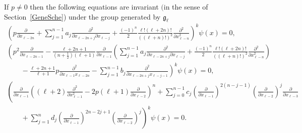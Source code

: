 \documentclass[pdftex]{sigma}
\numberwithin{equation}{section}
\begin{document}
\begin{proposition}
\label{prop6}
If $ p \neq 0 $ then the following equations are invariant $($in the sense of Section~{\rm \ref{GeneSche})} under the group generated
by ${\mathfrak g}_{\ell}$
\begin{gather}
    \left(p \frac{\partial}{\partial x_{\ell-2n}} + \sum\limits_{j=1}^{n-1} a_j \frac{\partial^2}{\partial x_{\ell-2n+j}
\partial x_{\ell-j}} + \frac{(-1)^n}{2} \frac{\ell! (\ell+2n)!}{((\ell+n)!)^2} \frac{\partial^2}{\partial x_{\ell-n}^2}
\right)^k \psi(x) = 0,
\label{inveqs1}
\\
    \left(p^2 \frac{\partial}{\partial x_{\ell-2n-1}} - \frac{\ell+2n+1}{(n+\frac{1}{2}) (\ell+1)}
\frac{\partial}{\partial x_{\ell-1}}   \left(\sum\limits_{j=1}^{n-1} a_j \frac{\partial^2}{\partial x_{\ell-2n+j}
\partial x_{\ell-j}} + \frac{(-1)^n}{2} \frac{\ell! (\ell+2n)!}{((\ell+n)!)^2} \frac{\partial^2}{\partial x_{\ell-n}^2}
\right) \right.\!
\nonumber
\\
\left.\qquad
{}
- \frac{\ell+2n+1}{\ell+1} p \frac{\partial^2}{\partial x_{\ell-1} x_{\ell-2n}} - \sum\limits_{j=1}^{n-1} b_j
\frac{\partial^2}{\partial x_{\ell-2n+j} x_{\ell-j-1}} \right)^k \psi(x) = 0,
\\
    \left(\frac{\partial}{\partial x_{\ell-1}} \left((\ell+2) \frac{\partial^2}{\partial x_{\ell-1}^2} - 2p (\ell+1)
\frac{\partial}{\partial x_{\ell-2}} \right)^n + \sum\limits_{j=0}^{n-1} c_j \left(\frac{\partial}{\partial x_{\ell-1}} \right)^{2(n-j-1)} \left(\frac{\partial}{\partial
x_{\ell-2}} \right)^j \frac{\partial}{\partial x_{\ell-3}}\right.\!
\nonumber
\\
\left.\qquad
{}
+ \sum\limits_{j=1}^n d_j \left(\frac{\partial}{\partial
x_{\ell-1}} \right)^{2n-2j+1} \left(\frac{\partial}{\partial x_{\ell-2}} \right)^j \right)^k \psi(x) = 0.
\label{inveqs3}
\end{gather}
\end{proposition}
\end{document}
